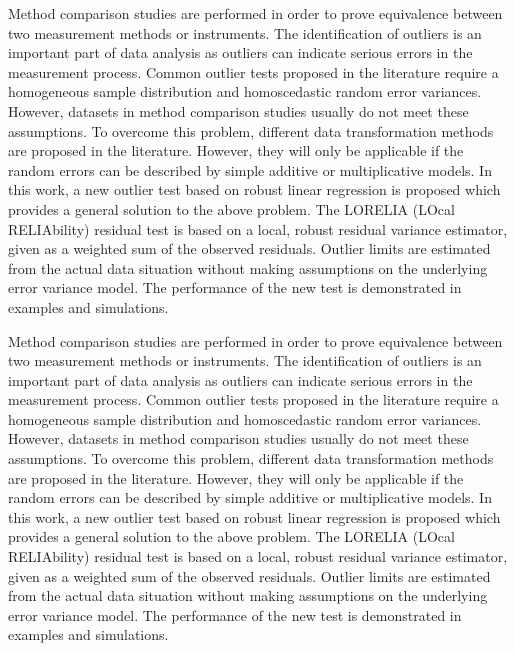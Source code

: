 Method comparison studies are performed in order to prove equivalence between two measurement methods or instruments. 
The identification of outliers is an important part of data analysis as outliers can indicate serious errors in the 
measurement process. Common outlier tests proposed in the literature require a homogeneous sample distribution and 
homoscedastic random error variances. However, datasets in method comparison studies usually do not meet these assumptions. 
To overcome this problem, different data transformation methods are proposed in the literature. However, they will only 
be applicable if the random errors can be described by simple additive or multiplicative models. 
In this work, a new outlier test based on robust linear regression is proposed which provides a general 
solution to the above problem. The LORELIA (LOcal RELIAbility) residual test is based on a local, robust 
residual variance estimator, given as a weighted sum of the observed residuals. Outlier limits are
estimated from the actual data situation without making assumptions on the underlying error variance model. 
The performance of the new test is demonstrated in examples and simulations.

Method comparison studies are performed in order to prove equivalence between two measurement methods or instruments. The identification of outliers is an important part of data analysis as outliers can indicate serious errors in the measurement process. Common outlier tests 
proposed in the literature require a homogeneous sample distribution and homoscedastic random error variances. However, datasets in method comparison studies usually do not meet these assumptions. To overcome this problem, different data transformation methods are proposed in the literature. However, they will only be applicable if the random errors can be described by simple additive or multiplicative models. In this work, a new outlier test based on robust linear regression is proposed which provides a general solution to the above problem. The LORELIA (LOcal RELIAbility) residual test is based on a local, robust residual variance estimator, given as a weighted sum of the observed residuals. Outlier limits are estimated from the actual data situation without making assumptions on the underlying error variance model. The performance of the new test is demonstrated in examples and simulations.

